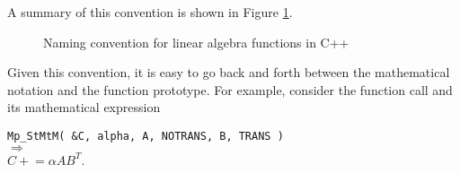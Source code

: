 \documentclass[acmtoms,acmnow]{acmtrans2m}
\begin{document}
A summary of this convention is shown in Figure
{}\ref{rsqppp:tbl:linalgpack_naming_convention}.
%
{\bsinglespace
\begin{figure}
\caption[Naming convention summary table for linear algebra functions]{
\label{rsqppp:tbl:linalgpack_naming_convention}
Naming convention for linear algebra functions in C++
}
\end{figure}
\esinglespace}
%
Given this convention, it is easy to go back and forth between the
mathematical notation and the function prototype. For example, consider the
function call and its mathematical expression\\[1.0ex]

{\bsinglespace
\hspace*{4ex}\parbox{\textwidth}{
{}\texttt{Mp\_StMtM( \&C, alpha, A, NOTRANS, B, TRANS )}\\
$\Longrightarrow$\\
$C +\!= \alpha A B^T$.
}
\esinglespace}\\[1ex]
\end{document}
